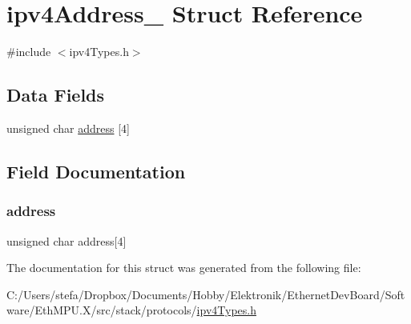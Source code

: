 \hypertarget{structipv4_address__}{}\section{ipv4\+Address\+\_\+ Struct Reference}
\label{structipv4_address__}


{\ttfamily \#include $<$ipv4\+Types.\+h$>$}

\subsection*{Data Fields}
\begin{DoxyCompactItemize}
\item 
unsigned char \mbox{\hyperlink{structipv4_address___adefc2d00eccd1111201e863dd3e1235d}{address}} \mbox{[}4\mbox{]}
\end{DoxyCompactItemize}


\subsection{Field Documentation}
\mbox{\label{structipv4_address___adefc2d00eccd1111201e863dd3e1235d}} 
\subsubsection{\texorpdfstring{address}{address}}
{\footnotesize\ttfamily unsigned char address\mbox{[}4\mbox{]}}



The documentation for this struct was generated from the following file\+:\begin{DoxyCompactItemize}
\item 
C\+:/\+Users/stefa/\+Dropbox/\+Documents/\+Hobby/\+Elektronik/\+Ethernet\+Dev\+Board/\+Software/\+Eth\+M\+P\+U.\+X/src/stack/protocols/\mbox{\hyperlink{ipv4_types_8h}{ipv4\+Types.\+h}}\end{DoxyCompactItemize}
